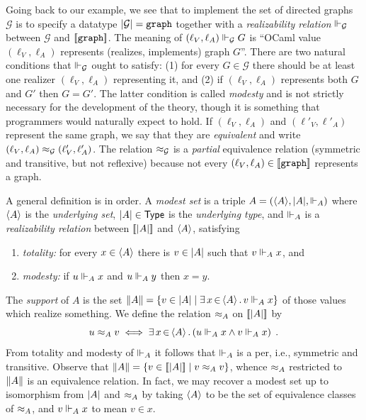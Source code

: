 Going back to our example, we see that to implement the set of
directed graphs $\mathcal{G}$ is to specify a datatype
$|\mathcal{G}| = \mathtt{graph}$ together with a
\emph{realizability relation} $\Vdash_{\mathcal{G}}$ between
$\mathcal{G}$ and $[\![\mathtt{graph}]\!]$. The meaning of $(\ell_V,
\ell_A) \Vdash_\mathcal{G} G$ is ``OCaml value $(\ell_V, \ell_A)$ represents
(realizes, implements) graph $G$''. There are two natural conditions
that $\Vdash_\mathcal{G}$ ought to satisfy: (1) for every $G \in
\mathcal{G}$ there should be at least one realizer $(\ell_V, \ell_A)$
representing it, and (2) if $(\ell_V, \ell_A)$ represents both $G$ and
$G'$ then $G = G'$. The latter condition is called \emph{modesty} and
is not strictly necessary for the development of the theory, though it
is something that programmers would naturally expect to hold. If
$(\ell_V, \ell_A)$ and $(\ell'_V, \ell'_A)$ represent the same graph,
we say that they are \emph{equivalent} and write $(\ell_V, \ell_A)
\approx_\mathcal{G} (\ell'_V, \ell'_A)$. The relation $\approx_\mathcal{G}$
is a \emph{partial} equivalence relation (symmetric and transitive,
but not reflexive) because not every $(\ell_V, \ell_A) \in
[\![\mathtt{graph}]\!]$ represents a graph.

\bigskip

A general definition is in order. A \emph{modest set} is a triple $A =
(\langle A \rangle, |A|, {\Vdash_A})$ where $\langle A \rangle$ is the
\emph{underlying set}, $|A| \in \mathsf{Type}$ is the \emph{underlying
  type}, and $\Vdash_A$ is a \emph{realizability relation} between
$[\![|A|]\!]$ and $\langle A \rangle$, satisfying
% 
\begin{enumerate}
\item \emph{totality:} for every $x \in \langle A \rangle$ there is $v \in
  |A|$ such that $v \Vdash_A x$, and
\item \emph{modesty:} if $u \Vdash_A x$ and $u \Vdash_A y$ then $x = y$.
\end{enumerate}
%
The \emph{support} of $A$ is the set $\|A\| = \{v \in
  |A| \mid \exists\, x \,{\in}\, \langle A \rangle\,.\,v \Vdash_A x\}$ of those values
which realize something. We define the relation $\approx_A$ on
$[\![|A|]\!]$ by
%
\begin{equation*}
  u \approx_A v
  \iff
  \exists\, x \,{\in}\, \langle A \rangle\,.\left(u \Vdash_A x \land v \Vdash_A x\right) \;.
\end{equation*}
%
From totality and modesty of $\Vdash_A$ it follows that $\Vdash_A$ is a per,
i.e., symmetric and transitive. Observe that $\|A\| = \{v \in
  [\![|A|]\!] \mid v \approx_A v\}$, whence $\approx_A$
restricted to $\|A\|$ is an equivalence relation. In fact, we
may recover a modest set up to isomorphism from $|A|$ and
$\approx_A$ by taking $\langle A \rangle$ to be the set of equivalence classes of
$\approx_A$, and $v \Vdash_A x$ to mean $v \in x$.

